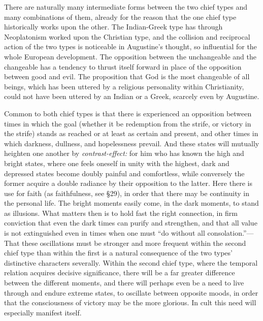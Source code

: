 \documentclass[12pt,a4paper]{book}
\newcommand{\opage}[1]{\marginnote{\footnotesize\textit{[#1]}}}
\begin{document}
There are naturally many intermediate forms between the two chief types and many
combinations of them, already for the reason that the one chief type historically
works upon the other. The Indian-Greek type has through Neoplatonism worked upon
the Christian type, and the collision and reciprocal action of the two types is
noticeable in Augustine's thought, so influential for the whole European
development. The opposition between the unchangeable and the changeable has a
tendency to thrust itself forward in place of the opposition between good and evil.
The proposition that God is the most changeable of all beings, which has been
uttered by a religious personality within Christianity, could not have been uttered
by an Indian or a Greek, scarcely even by Augustine.

Common to both chief types is that there is experienced an opposition between
times in which the goal (whether it be redemption from the strife, or victory in
the strife) stands as reached or at least as certain and present, and other times
in which darkness, dullness, and hopelessness prevail. And these states will
\opage{83}mutually heighten one another by \emph{contrast-effect:} for him who has known the
high and bright states, where one feels oneself in unity with the highest, dark and
depressed states become doubly painful and comfortless, while conversely the former
acquire a double radiance by their opposition to the latter. Here there is use for
faith (as faithfulness, see §29), in order that there may be continuity in the
personal life. The bright moments easily come, in the dark moments, to stand as
illusions. What matters then is to hold fast the right connection, in firm
conviction that even the dark times can purify and strengthen, and that all value is
not extinguished even in times when one must ``do without all consolation.''---That
these oscillations must be stronger and more frequent within the second chief type
than within the first is a natural consequence of the two types' distinctive
characters severally. Within the second chief type, where the temporal relation
acquires decisive significance, there will be a far greater difference between the
different moments, and there will perhaps even be a need to live through and endure
extreme states, to oscillate between opposite moods, in order that the consciousness
of victory may be the more glorious. In cult this need will especially manifest
itself.

\medskip
\end{document}
